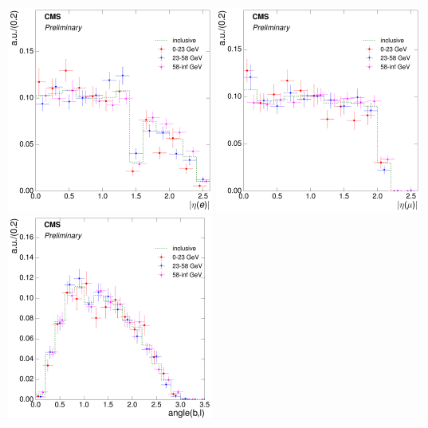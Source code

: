 \begin{figure}[hbtp]
    \centering
     \includegraphics[width=0.48\textwidth]{Chapters/04_Analysis/04b_XSections/images/8TeV/fit_variables/electron/MT/electron_absolute_eta/vjets/MT_electron_absolute_eta_2orMoreBtags_VJets_template_comparison.pdf}\hfill
     \includegraphics[width=0.48\textwidth]{Chapters/04_Analysis/04b_XSections/images/8TeV/fit_variables/muon/MT/muon_absolute_eta/vjets/MT_muon_absolute_eta_2orMoreBtags_VJets_template_comparison.pdf}\\
     \includegraphics[width=0.48\textwidth]{Chapters/04_Analysis/04b_XSections/images/8TeV/fit_variables/electron/MT/angle_bl/vjets/MT_angle_bl_2orMoreBtags_VJets_template_comparison.pdf}\hfill

\end{figure}
